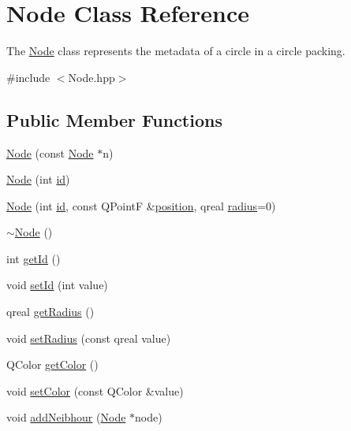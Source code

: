 \hypertarget{class_node}{}\section{Node Class Reference}
\label{class_node}


The \hyperlink{class_node}{Node} class represents the metadata of a circle in a circle packing.  




{\ttfamily \#include $<$Node.\+hpp$>$}

\subsection*{Public Member Functions}
\begin{DoxyCompactItemize}
\item 
\hyperlink{class_node_a1cb59fd72bfc69d4b741e091652a4365}{Node} (const \hyperlink{class_node}{Node} $\ast$n)
\item 
\hyperlink{class_node_a7f1af54cb91467d9717155c8a2ac0fde}{Node} (int \hyperlink{class_node_a59a543130a10c95f1e8642cf8c5645e8}{id})
\item 
\hyperlink{class_node_a4989e0d6f4483993bef734eaaeabb817}{Node} (int \hyperlink{class_node_a59a543130a10c95f1e8642cf8c5645e8}{id}, const Q\+Point\+F \&\hyperlink{class_node_af0201de36fd117a362e5f52fd6d75cde}{position}, qreal \hyperlink{class_node_abc1468f478d90c8d205b5753eacb1f3b}{radius}=0)
\item 
\hyperlink{class_node_aa0840c3cb5c7159be6d992adecd2097c}{$\sim$\+Node} ()
\item 
int \hyperlink{class_node_a3c7b8ccf4dab44216b997c5f63f11d9f}{get\+Id} ()
\item 
void \hyperlink{class_node_aa2755c83e214f119c0033ef1286cdb26}{set\+Id} (int value)
\item 
qreal \hyperlink{class_node_ad178553d97281f8dc87173323ef1254e}{get\+Radius} ()
\item 
void \hyperlink{class_node_ac460b65aa4b024fa1ae613f36e3d3f87}{set\+Radius} (const qreal value)
\item 
Q\+Color \hyperlink{class_node_a6c675f2c58d53abc9921871919a45f33}{get\+Color} ()
\item 
void \hyperlink{class_node_a44f165302fa884ac057ed6acc256d6e1}{set\+Color} (const Q\+Color \&value)
\item 
void \hyperlink{class_node_a1759916d01600ffcd414fd9035669ff0}{add\+Neibhour} (\hyperlink{class_node}{Node} $\ast$node)
\item 

\end{DoxyCompactItemize}
